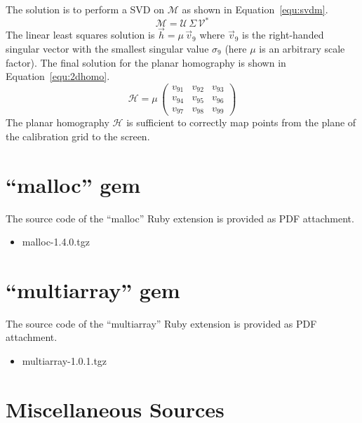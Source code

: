 \documentclass[12pt,a4paper,oneside,openright]{book}
\newcommand{\equ}[1]{Equation~\ref{equ:#1}}
\begin{document}
\begin{CJK}{UTF8}{}
The solution is to perform a \ac{SVD} on $\mathcal{M}$ as shown in \equ{svdm}.
\begin{equation}\label{equ:svdm}
  \mathcal{M}=\mathcal{U}\,\Sigma\,\mathcal{V}^*
\end{equation}
The linear least squares solution is $\vec{h}=\mu\,\vec{v}_9$ where $\vec{v}_9$ is the right-handed singular vector with the smallest singular value $\sigma_9$ (here $\mu$ is an arbitrary scale factor). The final solution for the planar homography is shown in \equ{2dhomo}.
\begin{equation}\label{equ:2dhomo}
  \mathcal{H}=\mu\,\begin{pmatrix}v_{91}&v_{92}&v_{93}\\v_{94}&v_{95}&v_{96}\\v_{97}&v_{98}&v_{99}\end{pmatrix}
\end{equation}
The planar homography $\mathcal{H}$ is sufficient to correctly map points from the plane of the calibration grid to the screen.

\section{``malloc'' gem}
The source code of the ``malloc'' Ruby extension is provided as PDF attachment.
\begin{itemize}
\item malloc-1.4.0.tgz 
\end{itemize}

\section{``multiarray'' gem}
The source code of the ``multiarray'' Ruby extension is provided as PDF attachment.
\begin{itemize}
\item multiarray-1.0.1.tgz 
\end{itemize}

\section{Miscellaneous Sources}

\end{CJK}
\end{document}
